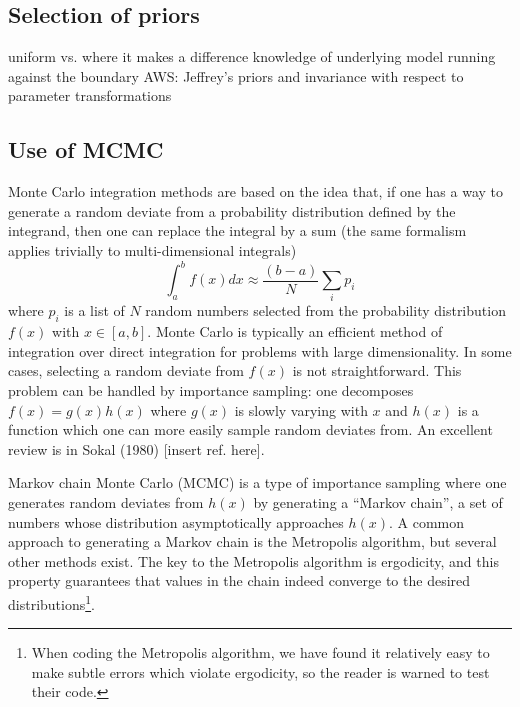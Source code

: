 \subsection{Selection of priors}  \label{subsec:selecting_priors}

  \bi
    \I uniform vs. where it makes a difference
    \I knowledge of underlying model 
    \I running against the boundary
    \I AWS: Jeffrey's priors and invariance with respect to
    parameter transformations
  \ei


\subsection{Use of MCMC}  \label{subsec:using_mcmc}

Monte Carlo integration methods are based on the idea that, if one
has a way to generate a random deviate from a probability distribution
defined by the integrand, then one can replace the integral by a sum
(the same formalism applies trivially to multi-dimensional integrals)
\begin{equation}
  \int_a^{b} f(x) dx \approx \frac{\left( b-a\right)}{N} \sum_i p_i 
\end{equation}
where $p_i$ is a list of $N$ random numbers selected from the
probability distribution $f(x)$ with $x \in [a,b]$. Monte
Carlo is typically an efficient method of integration
over direct integration for
problems with large dimensionality. In some cases,
selecting a random deviate from $f(x)$ is not straightforward.
This problem can be handled by importance sampling: one decomposes
$f(x)=g(x)h(x)$ where $g(x)$ is slowly varying with $x$ and $h(x)$
is a function which one can more easily sample random deviates from.
An excellent review is in Sokal (1980) [insert ref. here].

Markov chain Monte Carlo (MCMC) is a type of
importance sampling where one generates random deviates from $h(x)$
by generating a ``Markov chain'', a set of numbers whose distribution
asymptotically approaches $h(x)$. A common approach to generating
a Markov chain is the Metropolis algorithm, but several other methods
exist. The key to the Metropolis algorithm is ergodicity, and this
property guarantees that values in the chain indeed converge to
the desired distributions\footnote{When coding the Metropolis algorithm, we
have found it relatively easy to make subtle errors which violate
ergodicity, so the reader is warned to test their code.}.

